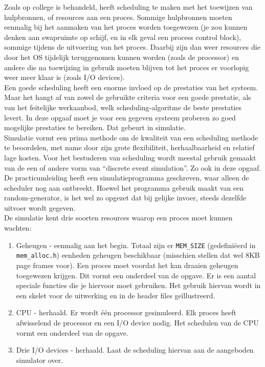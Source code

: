 \documentclass[11pt,a4paper,twoside]{article}
\begin{document}
Zoals op college is behandeld, heeft scheduling te maken met het
toewijzen van hulpbronnen, of resources aan een proces. Sommige
hulpbronnen moeten eenmalig bij het aanmaken van het proces worden
toegewezen (je zou kunnen denken aan swapruimte op schijf, en in elk
geval een process control block), sommige tijdens de uitvoering van het
proces. Daarbij zijn dan weer resources die door het OS tijdelijk
teruggenomen kunnen worden (zoals de processor) en andere die na
toewijzing in gebruik moeten blijven tot het proces er voorlopig weer
meer klaar is (zoals I/O devices).\\
Een goede scheduling heeft een enorme invloed op de prestaties van het
systeem. Maar het hangt af van zowel de gebruikte criteria voor een
goede prestatie, als van het feitelijke werkaanbod, welk scheduling-algoritme de
beste prestaties levert. In deze opgaaf moet je voor een gegeven
systeem proberen zo goed mogelijke prestaties te bereiken. Dat gebeurt
in simulatie.\\
Simulatie vormt een prima methode om de kwaliteit van een scheduling
methode te beoordelen, met name door zijn grote flexibiliteit, herhaalbaarheid en
relatief lage kosten. Voor het bestuderen van scheduling wordt meestal
gebruik gemaakt van de een of andere vorm van ``discrete event
simulation''. Zo ook in deze opgaaf. De practicumleiding heeft een
simulatieprogramma geschreven, waar alleen de scheduler nog aan
ontbreekt. Hoewel het programma gebruik maakt van een random-generator,
is het wel zo opgezet dat bij gelijke invoer, steeds dezelfde uitvoer
wordt gegeven. \\
De simulatie kent drie soorten resources waarop een proces moet kunnen
wachten:\\
\begin{enumerate}
  \item Geheugen - eenmalig aan het begin.
  Totaal zijn er \texttt{MEM\_SIZE} (gedefini\"eerd in
  \texttt{mem\_alloc.h}) eenheden geheugen beschikbaar
(misschien stellen dat wel 8KB page frames voor). Een proces moet
voordat het kan draaien geheugen toegewezen krijgen. Dit vormt een
onderdeel van de opgave. Er is een aantal speciale functies die je
hiervoor moet gebruiken. Het gebruik hiervan wordt in een skelet voor
de uitwerking en in de header files ge\"illustreerd.
    \item CPU - herhaald. Er wordt \'e\'en processor gesimuleerd. Elk proces heeft
afwisselend de processor en een I/O device nodig. Het schedulen van de
CPU vormt een onderdeel van de opgave.
    \item Drie I/O devices - herhaald. Laat de scheduling hiervan aan de aangeboden
simulator over.
\end{enumerate}
\end{document}
